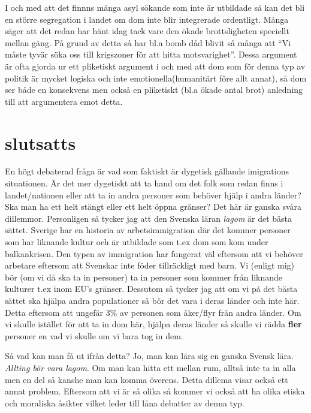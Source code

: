 \documentclass[12pt, onecolumn, letterpaper]{article}
\begin{document}
    I och med att det finnns många asyl sökande som inte är utbildade så kan det bli en större segregation i landet om dom inte blir integrerade ordentligt. Många säger att det redan har hänt idag tack vare den ökade brottsligheten speciellt mellan gäng\cite{Forskning&Framsteg}. På grund av detta så har bl.a bomb dåd blivit så många att ``Vi måste tyvär söka oss till krigszoner för att hitta motsvarighet''\cite{Expressen}. Dessa argument är ofta gjorda ur ett pliketiskt argument i och med att dom som för denna typ av politik är mycket logiska och inte emotionella(humanitärt före allt annat), så dom ser både en konsekvens men också en pliketiskt (bl.a ökade antal brot) anledning till att argumentera emot detta.


    \section{slutsatts}

    En högt debaterad fråga är vad som faktiskt är dygetisk gällande imigrations situationen. Är det mer dygetiskt att ta hand om det folk som redan finns i landet/nationen eller att ta in andra personer som behöver hjälp i andra länder? Ska man ha ett helt stängt eller ett helt öppna gränser? Det här är ganska svåra dillemmor. Personligen så tycker jag att den Svenska läran \textit{lagom} är det bästa sättet. Sverige har en historia av arbetsimmigration där det kommer personer som har liknande kultur och är utbildade som t.ex dom som kom under balkankrisen\cite{Wikipedia}. Den typen av immigration har fungerat väl eftersom att vi behöver arbetare eftersom att Svenskar inte föder tillräckligt med barn. Vi (enligt mig) bör (om vi då ska ta in personer) ta in personer som kommer från liknande kulturer t.ex inom EU's gränser. Dessutom så tycker jag att om vi på det bästa sättet ska hjälpa andra populationer så bör det vara i deras länder och inte här. Detta eftersom att ungefär 3\% av personen som åker/flyr från andra länder. Om vi skulle istället för att ta in dom här, hjälpa deras länder så skulle vi rädda \textbf{fler} personer en vad vi skulle om vi bara tog in dem.


    Så vad kan man få ut ifrån detta?
    Jo, man kan lära sig en ganska Svensk lära. \textit{Allting bör vara lagom}. Om man kan hitta ett mellan rum, alltså inte ta in alla men en del så kanshe man kan komma överens.
    Detta dillema visar också ett annat problem. Eftersom att vi är så olika så kommer vi också att ha olika etiska och moraliska åsikter vilket leder till låna debatter av denna typ.


    \printbibliography
\end{document}
